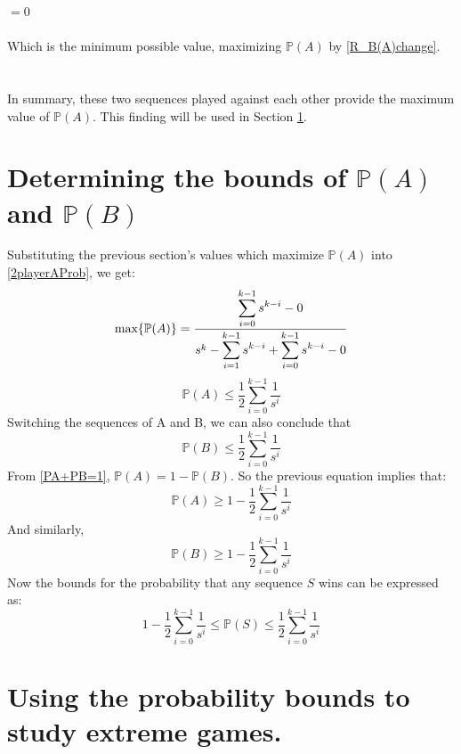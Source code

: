 \documentclass[english,12pt,a4paper,final]{article}
\begin{document}
$=0$
\\\\
Which is the minimum possible value, maximizing $\mathbb{P}(A)$ by \eqref{R_B(A)change}.
\\\\\\
In summary, these two sequences played against each other provide the maximum value of $\mathbb{P}(A)$. This finding will be used in Section \ref{bounds}.

\section{Determining the bounds of $\mathbb{P}(A)$ and $\mathbb{P}(B)$}\label{bounds}

Substituting the previous section's values which maximize $\mathbb{P}(A)$ into \eqref{2playerAProb}, we get:
\begin{equation*}
	\text{max}\{\mathbb{P}(A)\} = \frac{\mathlarger{\sum_{i=0}^{k-1}s^{k-i}} - 0}{s^k-\mathlarger{\sum_{i=1}^{k-1}s^{k-i}}+\mathlarger{\sum_{i=0}^{k-1}s^{k-i}}-0}
\end{equation*}
\begin{equation*}
	\mathbb{P}(A) \le \frac{1}{2}\sum_{i=0}^{k-1}\frac{1}{s^i}
\end{equation*}
Switching the sequences of A and B, we can also conclude that
\begin{equation*}
	\mathbb{P}(B) \le \frac{1}{2}\sum_{i=0}^{k-1}\frac{1}{s^i}
\end{equation*}
From \eqref{PA+PB=1}, $\mathbb{P}(A) = 1-\mathbb{P}(B)$. So the previous equation implies that:
\begin{equation*}
	\mathbb{P}(A) \ge 1-\frac{1}{2}\sum_{i=0}^{k-1}\frac{1}{s^i}
\end{equation*}
And similarly,
\begin{equation*}
	\mathbb{P}(B) \ge 1-\frac{1}{2}\sum_{i=0}^{k-1}\frac{1}{s^i}
\end{equation*}
Now the bounds for the probability that any sequence $S$ wins can be expressed as:
\begin{equation}\label{PBounds}
	1-\frac{1}{2}\sum_{i=0}^{k-1}\frac{1}{s^i} \le \mathbb{P}(S) \le \frac{1}{2}\sum_{i=0}^{k-1}\frac{1}{s^i}
\end{equation}

\section{Using the probability bounds to study extreme games.}
\end{document}
